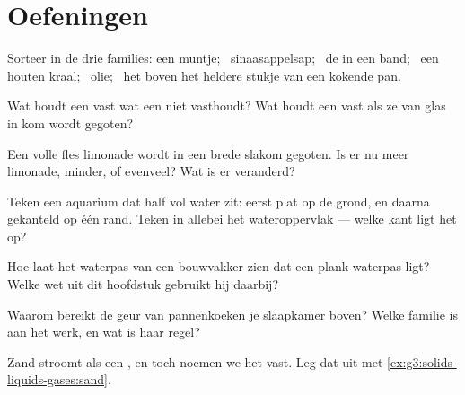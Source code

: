 \section{Oefeningen}

\begin{exercise}[$\star$]\label{exo:g3:solids-liquids-gases:1}
Sorteer in de drie families: een muntje; \ sinaasappelsap; \ de
 in een band; \ een houten kraal; \ olie; \ het  boven het
heldere stukje van een kokende pan.
\end{exercise}

\begin{exercise}[$\star$]\label{exo:g3:solids-liquids-gases:2}
Wat houdt een  vast wat een  niet vasthoudt? Wat
houdt een  vast als ze van glas in kom wordt gegoten?
\end{exercise}

\begin{exercise}[$\star$]\label{exo:g3:solids-liquids-gases:3}
Een volle fles limonade wordt in een brede slakom gegoten. Is er nu
meer limonade, minder, of evenveel? Wat is er veranderd?
\end{exercise}

\begin{exercise}[$\star$]\label{exo:g3:solids-liquids-gases:4}
Teken een aquarium dat half vol water zit: eerst plat op de grond, en
daarna gekanteld op één rand. Teken in allebei het wateroppervlak ---
welke kant ligt het op?
\end{exercise}

\begin{exercise}[$\star$]\label{exo:g3:solids-liquids-gases:5}
Hoe laat het waterpas van een bouwvakker zien dat een plank waterpas
ligt? Welke wet uit dit hoofdstuk gebruikt hij daarbij?
\end{exercise}

\begin{exercise}[$\star$]\label{exo:g3:solids-liquids-gases:6}
Waarom bereikt de geur van pannenkoeken je slaapkamer boven? Welke
familie is aan het werk, en wat is haar regel?
\end{exercise}

\begin{exercise}[$\star$]\label{exo:g3:solids-liquids-gases:7}
Zand stroomt als een , en toch noemen we het vast. Leg dat
uit met \cref{ex:g3:solids-liquids-gases:sand}.
\end{exercise}

